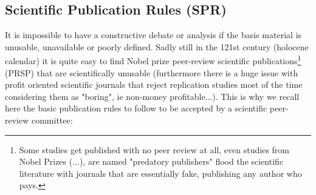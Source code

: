 	\subsection{Scientific Publication Rules (SPR)}\label{scientific publicatons rules}
	It is impossible to have a constructive debate or analysis if the basis material is unusable, unavailable or poorly defined. Sadly still in the 121st century (holocene calendar) it is quite easy to find Nobel prize peer-review scientific publications\footnote{Some studies get published with no peer review at all, even studies from Nobel Prizes (...), are named "predatory publishers" flood the scientific literature with journals that are essentially fake, publishing any author who pays.} (PRSP) that are scientifically unusable (furthermore there is a huge issue with profit oriented  scientific journals that reject replication studies most of the time considering them as "boring", ie non-money profitable...). This is why we recall here the basic publication rules to follow to be accepted by a scientific peer-review committee:
